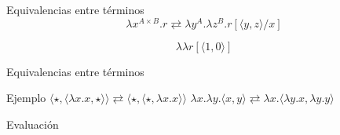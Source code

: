 \begin{frame}{Equivalencias entre términos}	
	\[ \lambda x^{A \times B}. r \rightleftarrows \lambda y^A. \lambda z^B. r[\langle y, z \rangle/x] \]

	\pause
	\[ \lambda \lambda r[\langle 1,0 \rangle] \]
	
	\pause
	
	\pause
	
\end{frame}

\begin{frame}{Equivalencias entre términos}	
\end{frame}

\begin{frame}{Ejemplo}
	$ \langle \star, \langle \lambda x.x, \star \rangle \rangle \rightleftarrows \langle \star, \langle \star, \lambda x.x \rangle \rangle $
	\pause
	$ \lambda x. \lambda y. \langle x, y \rangle \rightleftarrows \lambda x. \langle \lambda y.x, \lambda y.y \rangle $
\end{frame}

\iffalse
\begin{frame}{Evaluación}
\end{frame}

